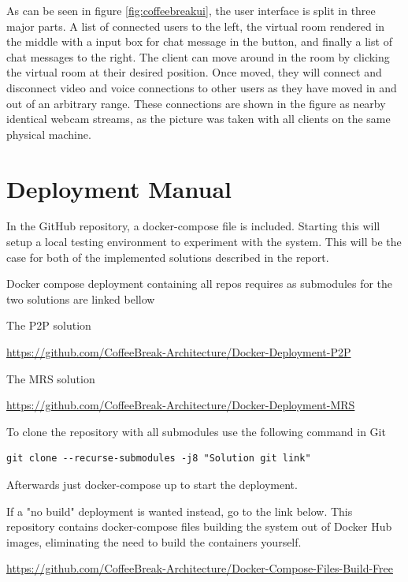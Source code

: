 As can be seen in figure \ref{fig:coffeebreakui}, the user interface is split in three major parts. A list of connected users to the left, the virtual room rendered in the middle with a input box for chat message in the button, and finally a list of chat messages to the right. The client can move around in the room by clicking the virtual room at their desired position. Once moved, they will connect and disconnect video and voice connections to other users as they have moved in and out of an arbitrary range. These connections are shown in the figure as nearby identical webcam streams, as the picture was taken with all clients on the same physical machine.

\section{Deployment Manual}

In the GitHub repository, a docker-compose file is included. Starting this will setup a local testing environment to experiment with the system. This will be the case for both of the implemented solutions described in the report.

Docker compose deployment containing all repos requires as submodules for the two solutions are linked bellow

The P2P solution

\href{https://github.com/CoffeeBreak-Architecture/Docker-Deployment-P2P}{https://github.com/CoffeeBreak-Architecture/Docker-Deployment-P2P}

The MRS solution

\href{https://github.com/CoffeeBreak-Architecture/Docker-Deployment-MRS}{https://github.com/CoffeeBreak-Architecture/Docker-Deployment-MRS}

To clone the repository with all submodules use the following command in Git

\begin{lstlisting}[language=text]
git clone --recurse-submodules -j8 "Solution git link"
\end{lstlisting}

Afterwards just docker-compose up to start the deployment. 

If a "no build" deployment is wanted instead, go to the link below. This repository contains docker-compose files building the system out of Docker Hub images, eliminating the need to build the containers yourself.

\href{https://github.com/CoffeeBreak-Architecture/Docker-Compose-Files-Build-Free}{https://github.com/CoffeeBreak-Architecture/Docker-Compose-Files-Build-Free}


